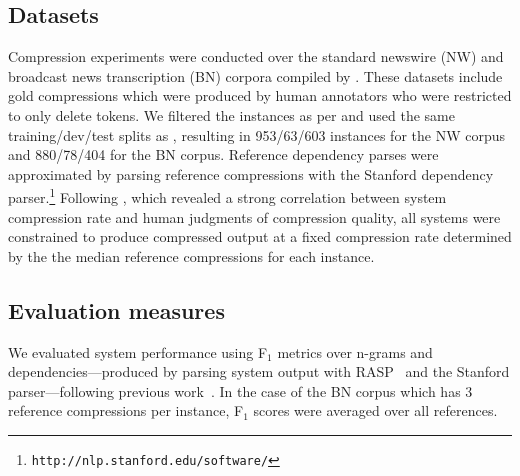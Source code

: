 \documentclass[11pt,a4paper]{article}
\begin{document}
\subsection{Datasets}
\label{data}
Compression experiments were conducted over the standard newswire (NW) and
broadcast news transcription (BN) corpora compiled by .
These datasets include gold compressions which were produced by human
annotators
who were restricted to only
delete tokens.
We filtered the instances as per  and used the
same training/dev/test splits as ,
resulting in 953/63/603 instances
for the NW corpus and 880/78/404 for the BN corpus.
Reference dependency parses were approximated by parsing reference
compressions with the Stanford dependency
parser.\footnote{\texttt{http://nlp.stanford.edu/software/}}
Following , which revealed a strong correlation between
system compression rate and human judgments of compression quality,
all systems were constrained to produce compressed output at a fixed
compression rate determined by the the median reference compressions
for each instance.

\subsection{Evaluation measures}
\label{measures}
We evaluated system performance using F$_1$ metrics over n-grams and
dependencies---produced by parsing
system output with
RASP~\cite{briscoe06} and the Stanford parser---following previous
work~\cite{unno06,clarke08,martins09a,napoles11a,thadani13a,thadani14}.
In the case of the BN corpus which has 3 reference compressions per instance,
F$_1$ scores were averaged over all references.





\end{document}
